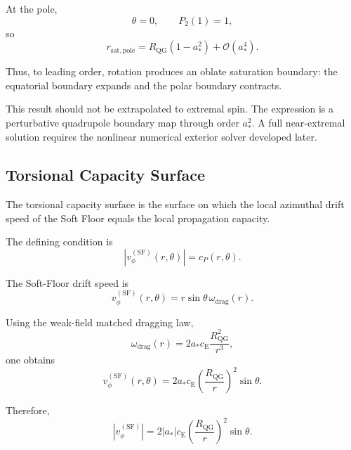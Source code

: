 At the pole,
\begin{equation}
    \theta = 0, \qquad P_2(1) = 1,
\end{equation}
so
\begin{equation}
    \boxed{ r_{\mathrm{sat,pole}} = R_{\mathrm{QG}} \left( 1-a_\ast^2 \right) + \mathcal{O}(a_\ast^4). }
\end{equation}

Thus, to leading order, rotation produces an oblate saturation boundary: the equatorial boundary expands and the polar boundary contracts.

This result should not be extrapolated to extremal spin. The expression is a perturbative quadrupole boundary map through order $a_\ast^2$. A full near-extremal solution requires the nonlinear numerical exterior solver developed later.

\subsection{Torsional Capacity Surface}

The torsional capacity surface is the surface on which the local azimuthal drift speed of the Soft Floor equals the local propagation capacity.

The defining condition is
\begin{equation}
    \left| v_{\phi}^{(\mathrm{SF})}(r,\theta) \right| = c_P(r,\theta).
\end{equation}

The Soft-Floor drift speed is
\begin{equation}
    v_{\phi}^{(\mathrm{SF})}(r,\theta) = r\sin\theta \, \omega_{\mathrm{drag}}(r).
\end{equation}

Using the weak-field matched dragging law,
\begin{equation}
    \omega_{\mathrm{drag}}(r) = 2a_\ast c_{\mathrm{E}} \frac{R_{\mathrm{QG}}^2}{r^3},
\end{equation}
one obtains
\begin{equation}
    v_{\phi}^{(\mathrm{SF})}(r,\theta) = 2a_\ast c_{\mathrm{E}} \left( \frac{R_{\mathrm{QG}}}{r} \right)^2 \sin\theta.
\end{equation}

Therefore,
\begin{equation}
    \left| v_{\phi}^{(\mathrm{SF})} \right| = 2|a_\ast|c_{\mathrm{E}} \left( \frac{R_{\mathrm{QG}}}{r} \right)^2 \sin\theta.
\end{equation}

